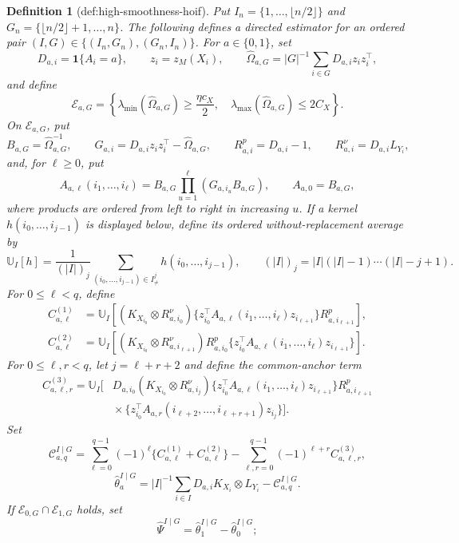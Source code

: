 \documentclass{article}
\newtheorem{definition}{Definition}
\begin{document}
\begin{definition}[def:high-smoothness-hoif]
Put \(I_n=\{1,\ldots,\lfloor n/2\rfloor\}\) and \(G_n=\{\lfloor n/2\rfloor+1,\ldots,n\}\).  The following defines a directed estimator for an ordered pair \((I,G)\in\{(I_n,G_n),(G_n,I_n)\}\).  For \(a\in\{0,1\}\), set
\[
 D_{a,i}=\mathbf 1\{A_i=a\},
 \qquad z_i=z_M(X_i),
 \qquad
 \widehat\Omega_{a,G}=|G|^{-1}\sum_{i\in G}D_{a,i}z_i z_i^\top,
\]
and define
\[
 \mathcal E_{a,G}=
 \left\{
  \lambda_{\min}(\widehat\Omega_{a,G})\geq\frac{\eta c_X}{2},
  \quad
  \lambda_{\max}(\widehat\Omega_{a,G})\leq2C_X
 \right\}.
\]
On \(\mathcal E_{a,G}\), put
\[
 B_{a,G}=\widehat\Omega_{a,G}^{-1},
 \qquad
 G_{a,i}=D_{a,i}z_i z_i^\top-\widehat\Omega_{a,G},
 \qquad
 R^p_{a,i}=D_{a,i}-1,
 \qquad
 R^\nu_{a,i}=D_{a,i}L_{Y_i},
\]
and, for \(\ell\geq0\), put
\[
 A_{a,\ell}(i_1,\ldots,i_\ell)
 =B_{a,G}\prod_{u=1}^{\ell}(G_{a,i_u}B_{a,G}),
 \qquad A_{a,0}=B_{a,G},
\]
where products are ordered from left to right in increasing \(u\).  If a kernel \(h(i_0,\ldots,i_{j-1})\) is displayed below, define its ordered without-replacement average by
\[
 \mathbb U_I[h]
 =\frac{1}{(|I|)_j}
   \sum_{(i_0,\ldots,i_{j-1})\in I^j_{\ne}}h(i_0,\ldots,i_{j-1}),
 \qquad (|I|)_j=|I|(|I|-1)\cdots(|I|-j+1).
\]
For \(0\leq\ell<q\), define
\[
 \begin{aligned}
 C^{(1)}_{a,\ell}
 &=\mathbb U_I\!\left[
  (K_{X_{i_0}}\otimes R^\nu_{a,i_0})
  \{z_{i_0}^\top A_{a,\ell}(i_1,\ldots,i_\ell)z_{i_{\ell+1}}\}
  R^p_{a,i_{\ell+1}}
 \right],\\
 C^{(2)}_{a,\ell}
 &=\mathbb U_I\!\left[
  (K_{X_{i_0}}\otimes R^\nu_{a,i_{\ell+1}})
  R^p_{a,i_0}
  \{z_{i_0}^\top A_{a,\ell}(i_1,\ldots,i_\ell)z_{i_{\ell+1}}\}
 \right].
 \end{aligned}
\]
For \(0\leq\ell,r<q\), let \(j=\ell+r+2\) and define the common-anchor term
\[
 \begin{aligned}
 C^{(3)}_{a,\ell,r}=\mathbb U_I\!\Big[&
 D_{a,i_0}(K_{X_{i_0}}\otimes R^\nu_{a,i_j})
 \{z_{i_0}^\top A_{a,\ell}(i_1,\ldots,i_\ell)z_{i_{\ell+1}}\}
 R^p_{a,i_{\ell+1}}\\
 &\mathrel{}\times
 \{z_{i_0}^\top A_{a,r}(i_{\ell+2},\ldots,i_{\ell+r+1})z_{i_j}\}
 \Big].
 \end{aligned}
\]
Set
\[
 \mathcal C_{a,q}^{I\mid G}
 =\sum_{\ell=0}^{q-1}(-1)^\ell
   \{C^{(1)}_{a,\ell}+C^{(2)}_{a,\ell}\}
  -\sum_{\ell,r=0}^{q-1}(-1)^{\ell+r}C^{(3)}_{a,\ell,r},
\]
\[
 \widehat\theta_a^{I\mid G}
 =|I|^{-1}\sum_{i\in I}D_{a,i}K_{X_i}\otimes L_{Y_i}
  -\mathcal C_{a,q}^{I\mid G}.
\]
If \(\mathcal E_{0,G}\cap\mathcal E_{1,G}\) holds, set
\[
 \widehat\Psi^{I\mid G}
 =\widehat\theta_1^{I\mid G}-\widehat\theta_0^{I\mid G};
\]
\end{definition}
\end{document}
